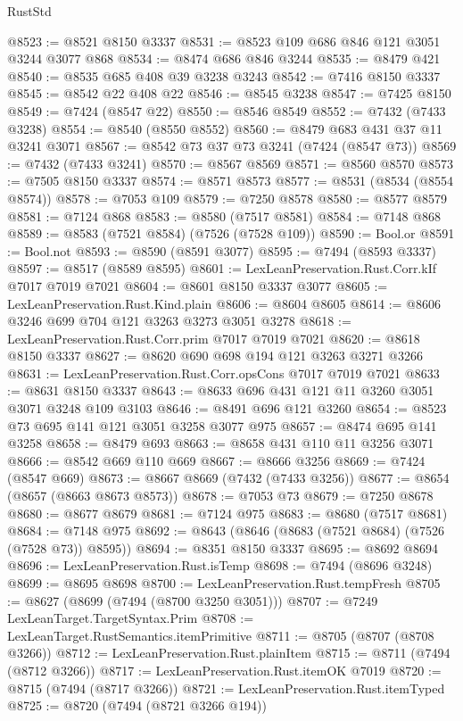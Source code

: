 \begin{lexlean}{RustStd}
\begin{coremodule}
@8523 := @8521 @8150 @3337
@8531 := @8523 @109 @686 @846 @121 @3051 @3244 @3077 @868
@8534 := @8474 @686 @846 @3244
@8535 := @8479 @421
@8540 := @8535 @685 @408 @39 @3238 @3243
@8542 := @7416 @8150 @3337
@8545 := @8542 @22 @408 @22
@8546 := @8545 @3238
@8547 := @7425 @8150
@8549 := @7424 (@8547 @22)
@8550 := @8546 @8549
@8552 := @7432 (@7433 @3238)
@8554 := @8540 (@8550 @8552)
@8560 := @8479 @683 @431 @37 @11 @3241 @3071
@8567 := @8542 @73 @37 @73 @3241 (@7424 (@8547 @73))
@8569 := @7432 (@7433 @3241)
@8570 := @8567 @8569
@8571 := @8560 @8570
@8573 := @7505 @8150 @3337
@8574 := @8571 @8573
@8577 := @8531 (@8534 (@8554 @8574))
@8578 := @7053 @109
@8579 := @7250 @8578
@8580 := @8577 @8579
@8581 := @7124 @868
@8583 := @8580 (@7517 @8581)
@8584 := @7148 @868
@8589 := @8583 (@7521 @8584) (@7526 (@7528 @109))
@8590 := Bool.or
@8591 := Bool.not
@8593 := @8590 (@8591 @3077)
@8595 := @7494 (@8593 @3337)
@8597 := @8517 (@8589 @8595)
@8601 := LexLeanPreservation.Rust.Corr.kIf @7017 @7019 @7021
@8604 := @8601 @8150 @3337 @3077
@8605 := LexLeanPreservation.Rust.Kind.plain
@8606 := @8604 @8605
@8614 := @8606 @3246 @699 @704 @121 @3263 @3273 @3051 @3278
@8618 := LexLeanPreservation.Rust.Corr.prim @7017 @7019 @7021
@8620 := @8618 @8150 @3337
@8627 := @8620 @690 @698 @194 @121 @3263 @3271 @3266
@8631 := LexLeanPreservation.Rust.Corr.opsCons @7017 @7019 @7021
@8633 := @8631 @8150 @3337
@8643 := @8633 @696 @431 @121 @11 @3260 @3051 @3071 @3248 @109 @3103
@8646 := @8491 @696 @121 @3260
@8654 := @8523 @73 @695 @141 @121 @3051 @3258 @3077 @975
@8657 := @8474 @695 @141 @3258
@8658 := @8479 @693
@8663 := @8658 @431 @110 @11 @3256 @3071
@8666 := @8542 @669 @110 @669
@8667 := @8666 @3256
@8669 := @7424 (@8547 @669)
@8673 := @8667 @8669 (@7432 (@7433 @3256))
@8677 := @8654 (@8657 (@8663 @8673 @8573))
@8678 := @7053 @73
@8679 := @7250 @8678
@8680 := @8677 @8679
@8681 := @7124 @975
@8683 := @8680 (@7517 @8681)
@8684 := @7148 @975
@8692 := @8643 (@8646 (@8683 (@7521 @8684) (@7526 (@7528 @73)) @8595))
@8694 := @8351 @8150 @3337
@8695 := @8692 @8694
@8696 := LexLeanPreservation.Rust.isTemp
@8698 := @7494 (@8696 @3248)
@8699 := @8695 @8698
@8700 := LexLeanPreservation.Rust.tempFresh
@8705 := @8627 (@8699 (@7494 (@8700 @3250 @3051)))
@8707 := @7249 LexLeanTarget.TargetSyntax.Prim
@8708 := LexLeanTarget.RustSemantics.itemPrimitive
@8711 := @8705 (@8707 (@8708 @3266))
@8712 := LexLeanPreservation.Rust.plainItem
@8715 := @8711 (@7494 (@8712 @3266))
@8717 := LexLeanPreservation.Rust.itemOK @7019
@8720 := @8715 (@7494 (@8717 @3266))
@8721 := LexLeanPreservation.Rust.itemTyped
@8725 := @8720 (@7494 (@8721 @3266 @194))

\end{coremodule}
\end{lexlean}
